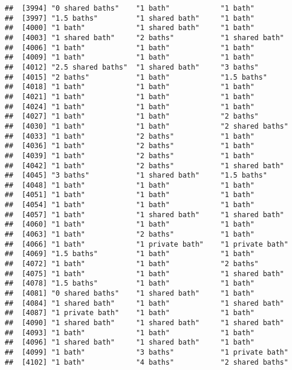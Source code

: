\documentclass[
]{article}
\begin{document}
\begin{verbatim}
##  [3994] "0 shared baths"    "1 bath"            "1 bath"           
##  [3997] "1.5 baths"         "1 shared bath"     "1 bath"           
##  [4000] "1 bath"            "1 shared bath"     "1 bath"           
##  [4003] "1 shared bath"     "2 baths"           "1 shared bath"    
##  [4006] "1 bath"            "1 bath"            "1 bath"           
##  [4009] "1 bath"            "1 bath"            "1 bath"           
##  [4012] "2.5 shared baths"  "1 shared bath"     "3 baths"          
##  [4015] "2 baths"           "1 bath"            "1.5 baths"        
##  [4018] "1 bath"            "1 bath"            "1 bath"           
##  [4021] "1 bath"            "1 bath"            "1 bath"           
##  [4024] "1 bath"            "1 bath"            "1 bath"           
##  [4027] "1 bath"            "1 bath"            "2 baths"          
##  [4030] "1 bath"            "1 bath"            "2 shared baths"   
##  [4033] "1 bath"            "2 baths"           "1 bath"           
##  [4036] "1 bath"            "2 baths"           "1 bath"           
##  [4039] "1 bath"            "2 baths"           "1 bath"           
##  [4042] "1 bath"            "2 baths"           "1 shared bath"    
##  [4045] "3 baths"           "1 shared bath"     "1.5 baths"        
##  [4048] "1 bath"            "1 bath"            "1 bath"           
##  [4051] "1 bath"            "1 bath"            "1 bath"           
##  [4054] "1 bath"            "1 bath"            "1 bath"           
##  [4057] "1 bath"            "1 shared bath"     "1 shared bath"    
##  [4060] "1 bath"            "1 bath"            "1 bath"           
##  [4063] "1 bath"            "2 baths"           "1 bath"           
##  [4066] "1 bath"            "1 private bath"    "1 private bath"   
##  [4069] "1.5 baths"         "1 bath"            "1 bath"           
##  [4072] "1 bath"            "1 bath"            "2 baths"          
##  [4075] "1 bath"            "1 bath"            "1 shared bath"    
##  [4078] "1.5 baths"         "1 bath"            "1 bath"           
##  [4081] "0 shared baths"    "1 shared bath"     "1 bath"           
##  [4084] "1 shared bath"     "1 bath"            "1 shared bath"    
##  [4087] "1 private bath"    "1 bath"            "1 bath"           
##  [4090] "1 shared bath"     "1 shared bath"     "1 shared bath"    
##  [4093] "1 bath"            "1 bath"            "1 bath"           
##  [4096] "1 shared bath"     "1 shared bath"     "1 bath"           
##  [4099] "1 bath"            "3 baths"           "1 private bath"   
##  [4102] "1 bath"            "4 baths"           "2 shared baths"   

\end{verbatim}
\end{document}
